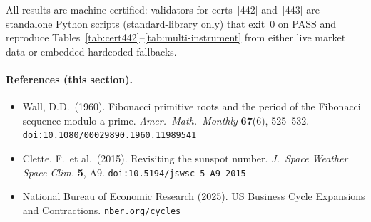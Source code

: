 All results are machine-certified: validators for certs~[442] and~[443]
are standalone Python scripts (standard-library only) that exit~$0$ on
PASS and reproduce Tables~\ref{tab:cert442}--\ref{tab:multi-instrument}
from either live market data or embedded hardcoded fallbacks.

\paragraph{References (this section).}
\begin{itemize}\setlength\itemsep{0pt}
\item Wall, D.D.\ (1960). Fibonacci primitive roots and the period of the
  Fibonacci sequence modulo a prime. \textit{Amer.\ Math.\ Monthly}
  \textbf{67}(6), 525--532. \texttt{doi:10.1080/00029890.1960.11989541}
\item Clette, F.\ et al.\ (2015). Revisiting the sunspot number. \textit{J.\
  Space Weather Space Clim.} \textbf{5}, A9.
  \texttt{doi:10.5194/jswsc-5-A9-2015}
\item National Bureau of Economic Research (2025). US Business Cycle
  Expansions and Contractions. \texttt{nber.org/cycles}
\end{itemize}
